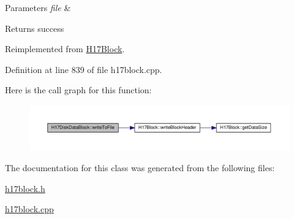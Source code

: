 \begin{DoxyParams}{Parameters}
{\em file} & \\
\hline
\end{DoxyParams}
\begin{DoxyReturn}{Returns}
success 
\end{DoxyReturn}


Reimplemented from \hyperlink{classH17Block_a59901675cd140c907fb6de4c8e0452d5}{H17\+Block}.



Definition at line 839 of file h17block.\+cpp.



Here is the call graph for this function\+:
\nopagebreak
\begin{figure}[H]
\begin{center}
\leavevmode
\includegraphics[width=350pt]{classH17DiskDataBlock_a6d7181e767bbc590cfee7c589c56930a_cgraph}
\end{center}
\end{figure}




The documentation for this class was generated from the following files\+:\begin{DoxyCompactItemize}
\item 
\hyperlink{h17block_8h}{h17block.\+h}\item 
\hyperlink{h17block_8cpp}{h17block.\+cpp}\end{DoxyCompactItemize}
